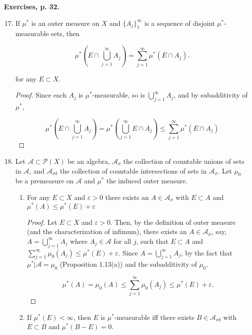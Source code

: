 \documentclass[11pt,oneside,english]{amsart}
\theoremstyle{definition}
\newcommand{\ve}{\varepsilon}
\newcommand{\MC}[1]{\mathcal{#1}}
\begin{document}
\rightline{\today}


\textbf{Exercises, p. 32.}

\vspace{1cm}
\begin{enumerate}
\setcounter{enumi}{16}


\item If $\mu^*$ is an outer measure on $X$ and $\{A_j\}_1^\infty$ is a sequence of disjoint $\mu^*$-measurable sets, then

\[
\mu^*\left(E\cap\bigcup_{j=1}^\infty A_j\right)=\sum_{j=1}^\infty\mu^*(E\cap A_j).
\]

for any $E\subset X$.

\begin{proof}
Since each $A_j$ is $\mu^*$-measurable, so is $\bigcup_{j=1}^\infty A_j$, and by subadditivity of $\mu^*$,

\[
\mu^*\left(E\cap \bigcup_{j=1}^\infty A_j\right)=\mu^*\left(\bigcup_{j=1}^\infty E\cap A_j\right)\leq\sum_{j=1}^\infty\mu^*(E\cap A_j)
\]
\end{proof}

\item Let $\MC{A}\subset\MC{P}(X)$ be an algebra, $\MC{A}_\sigma$ the collection of countable unions of sets in $\MC{A}$, and $\MC{A}_{\sigma\delta}$ the collection of countable intersections of sets in $\MC{A}_\sigma$. Let $\mu_0$ be a premeasure on $\MC{A}$ and $\mu^*$ the induced outer measure.

\begin{enumerate}
\item For any $E\subset X$ and $\ve>0$ there exists an $A\in \MC{A}_\sigma$ with $E\subset A$ and $\mu^*(A)\leq \mu^*(E)+\ve$

\begin{proof}
Let $E\subset X$ and $\ve>0$. Then, by the definition of outer measure (and the characterization of infimum), there exists an $A\in\MC{A}_\sigma$, say, $A=\bigcup_{j=1}^\infty A_j$ where $A_j\in\MC{A}$ for all $j$, such that $E\subset A$ and $\sum_{j=1}^\infty\mu_0(A_j)\leq\mu^*(E)+\ve$. Since $A=\bigcup_{j=1}^\infty A_j$, by the fact that $\mu^*|\MC{A}=\mu_0$ (Proposition 1.13(a)) and the subadditivity of $\mu_0$,

\[
\mu^*(A)=\mu_0(A)\leq\sum_{j=1}^\infty\mu_0(A_j)\leq\mu^*(E)+\ve.
\]\end{proof}

\item If $\mu^*(E)<\infty$, then $E$ is $\mu^*$-measurable iff there exists $B\in \MC{A}_{\sigma\delta}$ with $E\subset B$ and $\mu^*(B-E)=0$.


\end{enumerate}
\end{enumerate}
\end{document}
